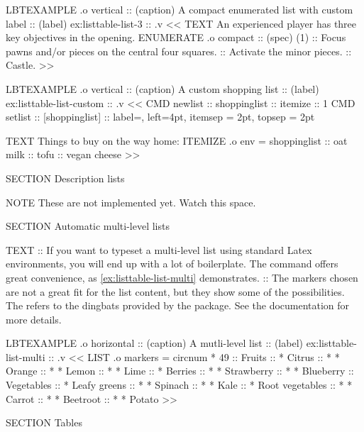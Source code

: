 \begin{lbt}
    LBTEXAMPLE .o vertical
    :: (caption) A compact enumerated list with custom label
    :: (label) ex:listtable-list-3
    :: .v <<
      TEXT An experienced player has three key objectives in the opening.
      ENUMERATE .o compact :: (spec) (1)
      :: Focus pawns and/or pieces on the central four squares.
      :: Activate the minor pieces.
      :: Castle.
    >>

    LBTEXAMPLE .o vertical
    :: (caption) A custom shopping list
    :: (label) ex:listtable-list-custom
    :: .v <<
      CMD newlist :: shoppinglist :: itemize :: 1
      CMD setlist :: [shoppinglist]
      :: label=, left=4pt, itemsep = 2pt, topsep = 2pt

      TEXT Things to buy on the way home:
      ITEMIZE .o env = shoppinglist
      :: oat milk
      :: tofu
      :: vegan cheese
    >>

    SECTION Description lists

    NOTE These are not implemented yet. Watch this space.

    SECTION Automatic multi-level lists

    TEXT
    :: If you want to typeset a multi-level list using standard Latex environments, you will end up with a lot of boilerplate. The \lbtlogo{} command  offers great convenience, as \cref{ex:listtable-list-multi} demonstrates.
    :: The markers chosen are not a great fit for the list content, but they show some of the possibilities. The  refers to the dingbats provided by the  package. See the documentation for more details.

    LBTEXAMPLE .o horizontal
    :: (caption) A mutli-level list
    :: (label) ex:listtable-list-multi
    :: .v <<
      LIST .o markers = circnum * 49
      :: Fruits
      :: * Citrus
      :: * * Orange
      :: * * Lemon
      :: * * Lime
      :: * Berries
      :: * * Strawberry
      :: * * Blueberry
      :: Vegetables
      :: * Leafy greens
      :: * * Spinach
      :: * * Kale
      :: * Root vegetables
      :: * * Carrot
      :: * * Beetroot
      :: * * Potato
    >>

    SECTION Tables


\end{lbt}
